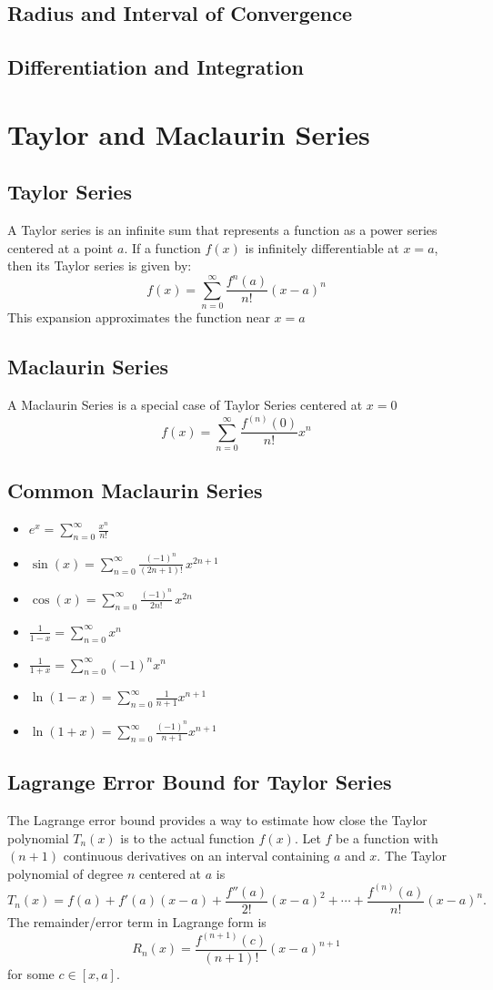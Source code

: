 \documentclass[11pt]{article}
\begin{document}
\subsection{Radius and Interval of Convergence}
\subsection{Differentiation and Integration}
\section{Taylor and Maclaurin Series}
\subsection{Taylor Series}
A Taylor series is an infinite sum that represents a function as a power series centered at a point $a$. If a function $f(x)$ is infinitely differentiable at $x = a$, then its Taylor series is given by:
\[
  f(x)=\sum_{n=0}^\infty\frac{f^n(a)}{n!}(x-a)^n
\]
This expansion approximates the function near $x=a$
\subsection{Maclaurin Series}
A Maclaurin Series is a special case of Taylor Series centered at $x=0$
\[
  f(x) = \sum_{n=0}^{\infty} \frac{f^{(n)}(0)}{n!} x^n
\]
\subsection{Common Maclaurin Series}
\begin{itemize}
  \item$\displaystyle e^x = \sum_{n=0}^\infty \frac{x^n}{n!}$
  \item$\displaystyle \sin(x) = \sum_{n=0}^\infty \frac{(-1)^n}{(2n+1)!}\,x^{2n+1}$
  \item$\displaystyle \cos(x) = \sum_{n=0}^\infty \frac{(-1)^n}{2n!}\,x^{2n}$
  \item$\displaystyle \frac{1}{1-x} = \sum_{n=0}^\infty x^n$
  \item$\displaystyle \frac{1}{1+x} = \sum_{n=0}^\infty (-1)^nx^n$
  \item$\displaystyle \ln(1-x) = \sum_{n=0}^\infty \frac{1}{n+1}x^{n+1}$
  \item$\displaystyle \ln(1+x) = \sum_{n=0}^\infty \frac{(-1)^n}{n+1}x^{n+1}$
\end{itemize}
\subsection{Lagrange Error Bound for Taylor Series}
The Lagrange error bound provides a way to estimate how close the Taylor polynomial $T_n(x)$ is to the actual function $f(x)$.  
Let $f$ be a function with $(n+1)$ continuous derivatives on an interval containing $a$ and $x$. The Taylor polynomial of degree $n$ centered at $a$ is
\[
T_n(x) = f(a) + f'(a)(x-a) + \frac{f''(a)}{2!}(x-a)^2 + \cdots + \frac{f^{(n)}(a)}{n!}(x-a)^n.
\]
The remainder/error term in Lagrange form is
\[
  R_n(x) = \frac{f^{(n+1)}(c)}{(n+1)!}(x-a)^{n+1}
\]
for some $c\in[x,a]$.
\end{document}
